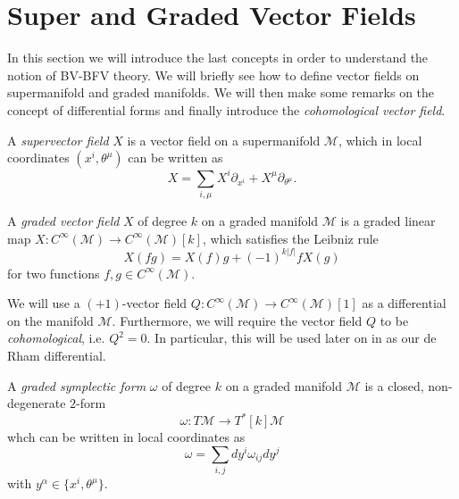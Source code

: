 \section{Super and Graded Vector Fields}
\label{sec:Sup_vector_fields}

In this section we will introduce the last concepts in order to understand the notion of BV-BFV theory.
We will briefly see how to define vector fields on supermanifold and graded manifolds.
We will then make some remarks on the concept of differential forms and finally introduce the \emph{cohomological vector field}.

\begin{definition}
    A \emph{supervector field} $X$ is a vector field on a supermanifold $\mathcal{M}$, which in local coordinates $(x^i, \theta^\mu)$ can be written as
    \begin{equation*}
        X = \sum_{i, \mu} X^i \partial_{x^i} + X^\mu \partial_{\theta^\mu} .
    \end{equation*}
\end{definition}

\begin{definition}
    A \emph{graded vector field} $X$ of degree $k$ on a graded manifold $\mathcal{M}$ is a graded linear map $X: C^\infty(\mathcal{M}) \rightarrow C^\infty(\mathcal{M})[k]$, which satisfies the Leibniz rule
    \begin{equation*}
        X(fg) = X(f)g + (-1)^{k|f|} f X(g)
    \end{equation*}
    for two functions $f,g \in C^\infty(\mathcal{M})$.
\end{definition}

We will use a $(+1)$-vector field $Q: C^\infty(\mathcal{M}) \rightarrow C^\infty(\mathcal{M})[1]$ as a differential on the manifold $\mathcal{M}$.
Furthermore, we will require the vector field $Q$ to be \emph{cohomological}, i.e. $Q^2 = 0$.
In particular, this will be used later on in  as our de Rham differential.

\begin{definition}
    A \emph{graded symplectic form} $\omega$ of degree $k$ on a graded manifold $\mathcal{M}$ is a closed, non-degenerate $2$-form
    \begin{equation*}
        \omega : T\mathcal{M} \rightarrow T^*[k]\mathcal{M}
    \end{equation*}
    whch can be written in local coordinates as
    \begin{equation*}
        \omega = \sum_{i,j} dy^i \omega_{ij} dy^j
    \end{equation*}
    with $y^\alpha \in \{x^i, \theta^\mu\}$.
\end{definition}